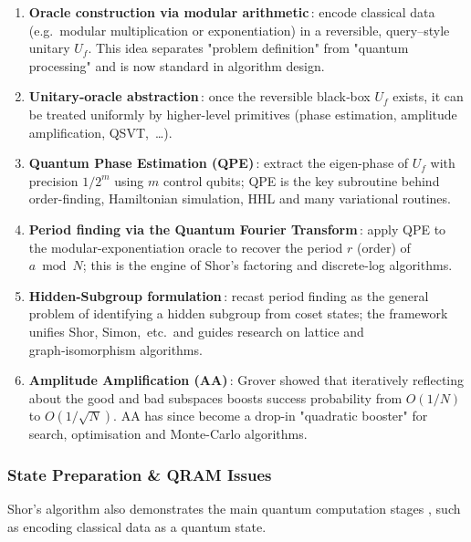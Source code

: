 \begin{enumerate}[label=\textbf{\arabic*.}]
	\item \textbf{Oracle construction via modular arithmetic}\,:  
	encode classical data (e.g.\ modular multiplication or exponentiation) in a reversible, query–style unitary \(U_f\).  
	This idea separates "problem definition" from "quantum processing" and is now standard in algorithm design.
	
	\item \textbf{Unitary‐oracle abstraction}\,:  
	once the reversible black‑box \(U_f\) exists, it can be treated uniformly by
	higher-level primitives (phase estimation, amplitude amplification, QSVT,~\ldots).
	
	\item \textbf{Quantum Phase Estimation (QPE)}\,:  
	extract the eigen-phase of \(U_f\) with precision \(1/2^m\) using \(m\) control qubits; 
	QPE is the key subroutine behind order-finding,	Hamiltonian simulation, HHL and many variational routines.
	
	\item \textbf{Period finding via the Quantum Fourier Transform}\,:  
	apply QPE to the modular-exponentiation oracle to recover the period \(r\) (order) of \(a \bmod N\); 
	this is the engine of Shor's factoring and discrete-log algorithms.
	
	\item \textbf{Hidden‑Subgroup formulation}\,:  
	recast period finding as the general problem of identifying a hidden subgroup from coset states; 
	the framework unifies Shor, Simon,~etc.\ and guides research on lattice and graph‑isomorphism algorithms.
	
	\item \textbf{Amplitude Amplification (AA)}\,:  
	Grover showed that iteratively reflecting about the good and bad subspaces boosts success probability 
	from \(O(1/N)\) to \(O(1/\sqrt N)\).
	AA has since become a drop-in "quadratic booster" for search, optimisation and Monte-Carlo algorithms.
\end{enumerate}


\subsubsection{State Preparation \& QRAM Issues}

Shor's algorithm also demonstrates the main quantum computation stages \cite{Nielsen:2010},
such as encoding classical data as a quantum state.

